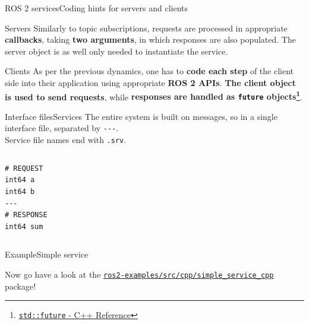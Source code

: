\begin{frame}{ROS 2 services}{Coding hints for servers and clients}
  \begin{block}{Servers}
    Similarly to topic subscriptions, requests are processed in appropriate \textbf{callbacks}, taking \textbf{two arguments}, in which responses are also populated. The server object is as well only needed to instantiate the service.
  \end{block}
  \begin{block}{Clients}
    As per the previous dynamics, one has to \textbf{code each step} of the client side into their application using appropriate \textbf{ROS 2 APIs}. \textbf{The client object is used to send requests}, while \textbf{responses are handled as \texttt{future} objects\footnote{\href{https://en.cppreference.com/w/cpp/thread/future}{\color{blue}\underline{\texttt{std::future} - C++ Reference}}}}.
  \end{block}
\end{frame}

\begin{frame}[fragile]{Interface files}{Services}
  The entire system is built on messages, so  in a single interface file, separated by \texttt{-{}-{}-}.\\
  Service file names end with \texttt{.srv}.
  \begin{columns}
  \begin{lstlisting}[language=ros2msg, caption=Definition of the \texttt{example\_interfaces/srv/AddTwoInts} service.]
# REQUEST
int64 a
int64 b
---
# RESPONSE
int64 sum\end{lstlisting}
  \end{columns}
\end{frame}

\begin{frame}{Example}{Simple service}
  \begin{block}{}
    \centering
    Now go have a look at the \href{https://github.com/IntelligentSystemsLabUTV/ros2-examples/tree/humble/src/cpp/simple_service_cpp}{\color{blue}\underline{\texttt{ros2-examples/src/cpp/simple\_service\_cpp}}} package!
  \end{block}
\end{frame}
